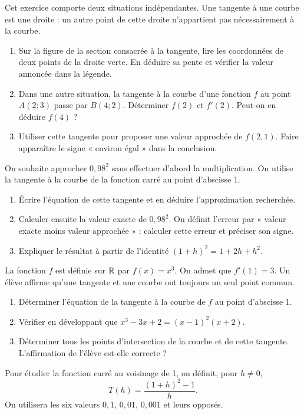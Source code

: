 Cet exercice comporte deux situations indépendantes. Une tangente à une courbe est une droite : un autre point de cette droite n’appartient pas nécessairement à la courbe.
\begin{enumerate}[label=\arabic*.]
\item Sur la figure de la section consacrée à la tangente, lire les coordonnées de deux points de la droite verte. En déduire sa pente et vérifier la valeur annoncée dans la légende.
\item Dans une autre situation, la tangente à la courbe d’une fonction $f$ au point $A(2;3)$ passe par $B(4;2)$. Déterminer $f(2)$ et $f\prime(2)$. Peut-on en déduire $f(4)$ ?
\item Utiliser cette tangente pour proposer une valeur approchée de $f(2{,}1)$. Faire apparaître le signe « environ égal » dans la conclusion.
\end{enumerate}
On souhaite approcher $0{,}98^2$ sans effectuer d’abord la multiplication. On utilise la tangente à la courbe de la fonction carré au point d’abscisse 1.
\begin{enumerate}[label=\arabic*.]
\item Écrire l’équation de cette tangente et en déduire l’approximation recherchée.
\item Calculer ensuite la valeur exacte de $0{,}98^2$. On définit l’erreur par « valeur exacte moins valeur approchée » : calculer cette erreur et préciser son signe.
\item Expliquer le résultat à partir de l’identité $(1+h)^2=1+2h+h^2$.
\end{enumerate}
La fonction $f$ est définie sur $\mathbb R$ par $f(x)=x^3$. On admet que $f\prime(1)=3$. Un élève affirme qu’une tangente et une courbe ont toujours un seul point commun.
\begin{enumerate}[label=\arabic*.]
\item Déterminer l’équation de la tangente à la courbe de $f$ au point d’abscisse 1.
\item Vérifier en développant que $x^3-3x+2=(x-1)^2(x+2)$.
\item Déterminer tous les points d’intersection de la courbe et de cette tangente. L’affirmation de l’élève est-elle correcte ?
\end{enumerate}
Pour étudier la fonction carré au voisinage de 1, on définit, pour $h\ne0$,\[T(h)=\dfrac{(1+h)^2-1}{h}.\]On utilisera les six valeurs $0{,}1$, $0{,}01$, $0{,}001$ et leurs opposés.
